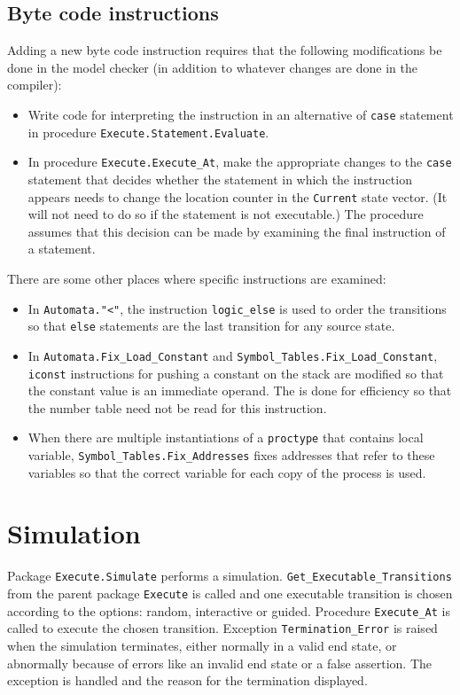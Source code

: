 \documentclass[11pt]{article}
\newcommand*{\p}[1]{\texttt{#1}}
\begin{document}
\subsection{Byte code instructions}
Adding a new byte code instruction requires that the following
modifications be done in the model checker (in addition to whatever
changes are done in the compiler):
\begin{itemize}
\item Write code for interpreting the instruction in an alternative of
\p{case} statement in procedure \p{Execute.Statement.Evaluate}.
\item In procedure \p{Execute.Execute\_At}, make the appropriate changes
to the \p{case} statement that decides whether the statement in which
the instruction appears needs to change the location counter in the
\p{Current} state vector. (It will not need to do so if the statement is
not executable.) The procedure assumes that this decision can
be made by examining the final instruction of a statement.
\end{itemize}
There are some other places where specific instructions are examined:
\begin{itemize}
\item In \p{Automata.}\verb+"<"+, the instruction \p{logic\_else} is
used to order the transitions so that \p{else} statements are the last
transition for any source state.
\item In \p{Automata.Fix\_Load\_Constant} and
\p{Symbol\_Tables.Fix\_Load\_Constant}, \p{iconst} instructions for 
pushing a constant on the stack are modified so that the constant value
is an immediate operand. The is done for efficiency so that the number
table need not be read for this instruction.
\item When there are multiple instantiations of a \p{proctype} that
contains local variable, \p{Symbol\_Tables.Fix\_Addresses} fixes
addresses that refer to these variables so that the correct variable for
each copy of the process is used.
\end{itemize}

\section{Simulation}
Package \p{Execute.Simulate} performs a simulation.
\p{Get\_Executable\_Transitions} from the parent package \p{Execute} is
called and one executable transition is chosen according to the options:
random, interactive or guided. Procedure \p{Execute\_At} is called to
execute the chosen transition. Exception \p{Termination\_Error} is raised
when the simulation terminates, either normally in a valid end state, or
abnormally because of errors like an invalid end state or a false
assertion. The exception is handled and the reason for the termination
displayed.
\end{document}
